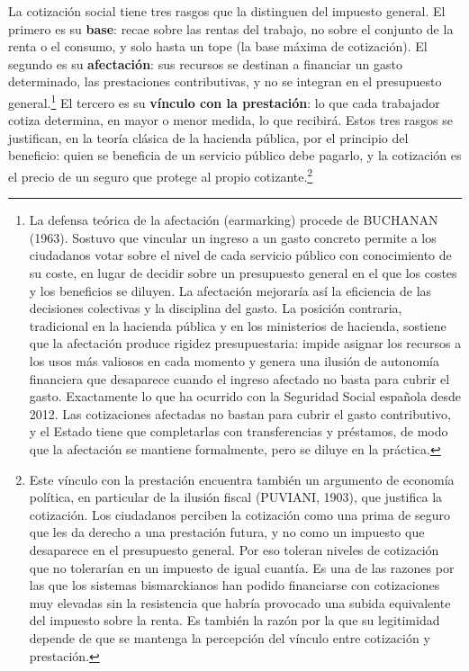 \documentclass[10pt,a4paper]{article}
\begin{document}
La cotización social tiene tres rasgos que la distinguen del impuesto general. El primero es su \textbf{base}: recae sobre las rentas del trabajo, no sobre el conjunto de la renta o el consumo, y solo hasta un tope (la base máxima de cotización). El segundo es su \textbf{afectación}: sus recursos se destinan a financiar un gasto determinado, las prestaciones contributivas, y no se integran en el presupuesto general.\footnote{La defensa teórica de la afectación (earmarking) procede de BUCHANAN (1963). Sostuvo que vincular un ingreso a un gasto concreto permite a los ciudadanos votar sobre el nivel de cada servicio público con conocimiento de su coste, en lugar de decidir sobre un presupuesto general en el que los costes y los beneficios se diluyen. La afectación mejoraría así la eficiencia de las decisiones colectivas y la disciplina del gasto. La posición contraria, tradicional en la hacienda pública y en los ministerios de hacienda, sostiene que la afectación produce rigidez presupuestaria: impide asignar los recursos a los usos más valiosos en cada momento y genera una ilusión de autonomía financiera que desaparece cuando el ingreso afectado no basta para cubrir el gasto. Exactamente lo que ha ocurrido con la Seguridad Social española desde 2012. Las cotizaciones afectadas no bastan para cubrir el gasto contributivo, y el Estado tiene que completarlas con transferencias y préstamos, de modo que la afectación se mantiene formalmente, pero se diluye en la práctica.
} El tercero es su \textbf{vínculo con la prestación}: lo que cada trabajador cotiza determina, en mayor o menor medida, lo que recibirá. Estos tres rasgos se justifican, en la teoría clásica de la hacienda pública, por el principio del beneficio: quien se beneficia de un servicio público debe pagarlo, y la cotización es el precio de un seguro que protege al propio cotizante.\footnote{Este vínculo con la prestación encuentra también un argumento de economía política, en particular de la ilusión fiscal (PUVIANI, 1903), que justifica la cotización. Los ciudadanos perciben la cotización como una prima de seguro que les da derecho a una prestación futura, y no como un impuesto que desaparece en el presupuesto general. Por eso toleran niveles de cotización que no tolerarían en un impuesto de igual cuantía. Es una de las razones por las que los sistemas bismarckianos han podido financiarse con cotizaciones muy elevadas sin la resistencia que habría provocado una subida equivalente del impuesto sobre la renta. Es también la razón por la que su legitimidad depende de que se mantenga la percepción del vínculo entre cotización y prestación.
}
\end{document}

